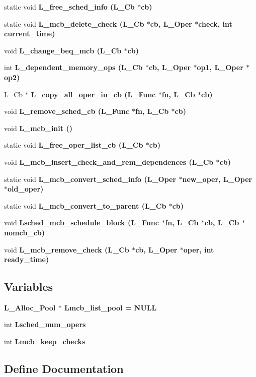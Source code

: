 \begin{CompactItemize}
\item 
static void \bf{L\_\-free\_\-sched\_\-info} (L\_\-Cb $\ast$cb)
\item 
static void \bf{L\_\-mcb\_\-delete\_\-check} (L\_\-Cb $\ast$cb, L\_\-Oper $\ast$check, int \bf{current\_\-time})
\item 
void \bf{L\_\-change\_\-beq\_\-mcb} (L\_\-Cb $\ast$cb)
\item 
int \bf{L\_\-dependent\_\-memory\_\-ops} (L\_\-Cb $\ast$cb, L\_\-Oper $\ast$op1, L\_\-Oper $\ast$op2)
\item 
L\_\-Cb $\ast$ \bf{L\_\-copy\_\-all\_\-oper\_\-in\_\-cb} (L\_\-Func $\ast$fn, L\_\-Cb $\ast$cb)
\item 
void \bf{L\_\-remove\_\-sched\_\-cb} (L\_\-Func $\ast$fn, L\_\-Cb $\ast$cb)
\item 
void \bf{L\_\-mcb\_\-init} ()
\item 
static void \bf{L\_\-free\_\-oper\_\-list\_\-cb} (L\_\-Cb $\ast$cb)
\item 
void \bf{L\_\-mcb\_\-insert\_\-check\_\-and\_\-rem\_\-dependences} (L\_\-Cb $\ast$cb)
\item 
static void \bf{L\_\-mcb\_\-convert\_\-sched\_\-info} (L\_\-Oper $\ast$new\_\-oper, L\_\-Oper $\ast$old\_\-oper)
\item 
static void \bf{L\_\-mcb\_\-convert\_\-to\_\-parent} (L\_\-Cb $\ast$cb)
\item 
void \bf{Lsched\_\-mcb\_\-schedule\_\-block} (L\_\-Func $\ast$fn, L\_\-Cb $\ast$cb, L\_\-Cb $\ast$nomcb\_\-cb)
\item 
void \bf{L\_\-mcb\_\-remove\_\-check} (L\_\-Cb $\ast$cb, L\_\-Oper $\ast$oper, int ready\_\-time)
\end{CompactItemize}
\subsection*{Variables}
\begin{CompactItemize}
\item 
\bf{L\_\-Alloc\_\-Pool} $\ast$ \bf{Lmcb\_\-list\_\-pool} = \bf{NULL}
\item 
int \bf{Lsched\_\-num\_\-opers}
\item 
int \bf{Lmcb\_\-keep\_\-checks}
\end{CompactItemize}


\subsection{Define Documentation}
